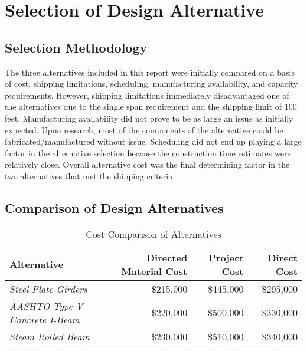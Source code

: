 \chapter{Selection of Design Alternative}

\section{Selection Methodology}
The three alternatives included in this report were initially compared on a basis of cost, shipping limitations, scheduling, manufacturing availability, and capacity requirements. However, shipping limitations immediately disadvantaged one of the alternatives due to the single span requirement and the shipping limit of 100 feet. Manufacturing availability did not prove to be as large an issue as initially expected. Upon research, most of the components of the alternative could be fabricated/manufactured without issue. Scheduling did not end up playing a large factor in the alternative selection because the construction time estimates were relatively close. Overall alternative cost was the final determining factor in the two alternatives that met the shipping criteria.

\section{Comparison of Design Alternatives}


\begin{table}[H]
\centering
\caption{Cost Comparison of Alternatives}\label{tab:costcomp}
\vspace{0.5cm}
\begin{tabular}{p{4.9cm}rrr}\toprule\midrule
\textbf{Alternative}                 & \textbf{Directed Material Cost}  & \textbf{Project Cost} & \textbf{Direct Cost} \\ \midrule
\emph{Steel Plate Girders}           & \$215,000                        & \$445,000             & \$295,000             \\ \midrule
\emph{AASHTO Type V Concrete I-Beam} & \$220,000                        & \$500,000             & \$330,000              \\ \midrule
\emph{Steam Rolled Beam}             & \$230,000                        & \$510,000             & \$340,000               \\ \bottomrule
\end{tabular}
\end{table}


